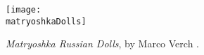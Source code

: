 \begin{figure}[H]
    \centering
    \caption{\textit{Matryoshka Russian Dolls}, by Marco Verch \cite{Verch2018}.}
    \label{fig:matryoshkaDolls}
    
    \texttt{[image: \\matryoshkaDolls]}
\end{figure}
